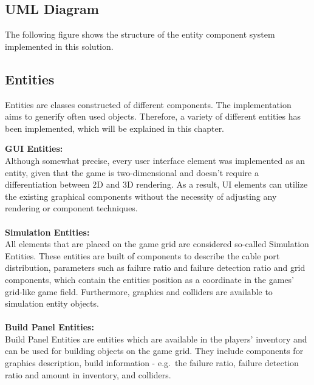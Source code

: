 \subsection{UML Diagram}\label{subsec:uml-diagram}
The following figure shows the structure of the entity component system implemented in this solution.

\subsection{Entities}\label{subsec:entities}
Entities are classes constructed of different components.
The implementation aims to generify often used objects.
Therefore, a variety of different entities has been implemented, which will be explained in this chapter.

\textbf{GUI Entities:} \\
Although somewhat precise, every user interface element was implemented as an entity, given that the game is two-dimensional and doesn't require a differentiation between 2D and 3D rendering.
As a result, UI elements can utilize the existing graphical components without the necessity of adjusting any rendering or component techniques.
\\ \\
\textbf{Simulation Entities:} \\
All elements that are placed on the game grid are considered so-called Simulation Entities.
These entities are built of components to describe the cable port distribution, parameters such as failure ratio and failure detection ratio and grid components, which contain the
entities position as a coordinate in the games' grid-like game field.
Furthermore, graphics and colliders are available to simulation entity objects.
\\ \\
\textbf{Build Panel Entities:} \\
Build Panel Entities are entities which are available in the players' inventory and can be used for building objects on the game grid.
They include components for graphics description, build information - e.g.\ the failure ratio, failure detection ratio and amount in inventory,
and colliders.

